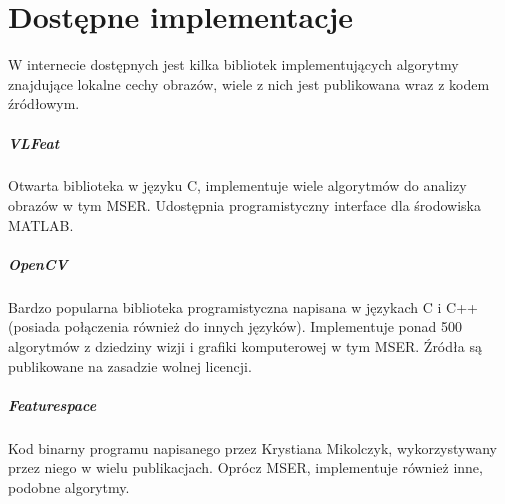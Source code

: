 
\section{Dostępne implementacje}

W internecie dostępnych jest kilka bibliotek implementujących algorytmy
znajdujące lokalne cechy obrazów, wiele z nich jest publikowana wraz z kodem
źródłowym.

\subparagraph{VLFeat \cite{vlfeat}}

Otwarta biblioteka w języku C, implementuje wiele algorytmów do analizy obrazów
w tym MSER. Udostępnia programistyczny interface dla środowiska MATLAB.

\subparagraph{OpenCV \cite{opencv}}

Bardzo popularna biblioteka programistyczna napisana w językach C i C++
(posiada połączenia również do innych języków). Implementuje ponad 500
algorytmów z dziedziny wizji i grafiki komputerowej w tym MSER. Źródła są
publikowane na zasadzie wolnej licencji.

\subparagraph{Featurespace \cite{featurespace}}

Kod binarny programu napisanego przez Krystiana Mikolczyk, wykorzystywany przez
niego w wielu publikacjach. Oprócz MSER, implementuje również inne, podobne
algorytmy.
